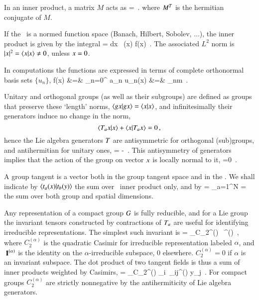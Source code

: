 In an inner product, a matrix $M$ acts as
\beq
{} =
\,.
where $\dual{M}$ is the hermitian conjugate of $M$.

If the \statesp\ is a normed function space (Banach, Hilbert, Sobolev, ...),
the inner product is given by the integral
\beq
{} = \int dx \, (x) f(x)
\,.
The associated $L^2$ norm is
$|\ssp|^2 = \dotProd{\ssp}{\ssp} \neq 0$, unless $\ssp = 0$.

In computations the functions are expressed in terms of
complete orthonormal basis sets $\{u_n\}$,
\bea
f(x) &=& \sum_{n=0}^{\infty} a_n u_n(x)
    \continue
{} &=& \delta_{nm}
\,.
\label{basisL2}
\eea

Unitary and orthogonal groups (as well as their subgroups) are
defined as groups that preserve these `length' norms,
$\left\langle {\ensuremath{g}x}|{g x} \right\rangle =  \left\langle {x}|{x} \right\rangle$, and
infinitesimally their generators induce no change in the norm,
\[
\left\langle { \ensuremath{T}_a\ensuremath{x}}|{x} \right\rangle
  +\left\langle {\ensuremath{x}}|{T_ax} \right\rangle =0
\,,
\]
hence the Lie algebra generators
$T$ are antisymmetric for orthogonal (sub)groups,
and antihermitian for unitary ones,
\beq
\dual{\Lg} = - \Lg
\,.
This antisymmetry of generators
implies that the action of the group on vector $x$ is
locally normal to it,
\beq
{} =0
\,.

A group tangent  is a vector both in the group
tangent space and in the \statesp.
We shall indicate by $\left\langle {\ensuremath{t}_{a}(x)}|{t_{b}(y)} \right\rangle$  the sum over \statesp\ inner product only, and by
\beq
{} =
    \sum_{a=1}^N  =
the sum over both group and spatial dimensions.

Any representation of a compact group $G$ is fully
reducible, and for a Lie group
the invariant tensors constructed by contractions
of $T_a$ are useful for identifying irreducible
representations. The simplest such invariant is
\beq
\dual{\Lg} \cdot \Lg = \sum_\alpha C_2^{(\alpha)} \, \id^{(\alpha)}
\,,
where $C_2^{(\alpha)}$ is the quadratic Casimir for
irreducible representation labeled $\alpha$, and
${\ \hbox{{\rm 1}\kern-.6em\hbox{\rm 1}}}^{(\alpha)}$ is the identity on the $\alpha$-irreducible
subspace, 0 elsewhere. $ C_2^{(\alpha)} =0$ if $\alpha$
is an invariant subspace.
The dot product of two tangent fields
 is thus a sum of inner products
weighted by Casimirs,
\beq
{}
   = \sum_\alpha C_2^{(\alpha)} _i\, \delta_{ij}^{(\alpha)} y_j
\,.
For compact groups $C_2^{(\alpha)}$ are strictly nonnegative by
the antihermiticity  of Lie algebra generators.

    \fi %

